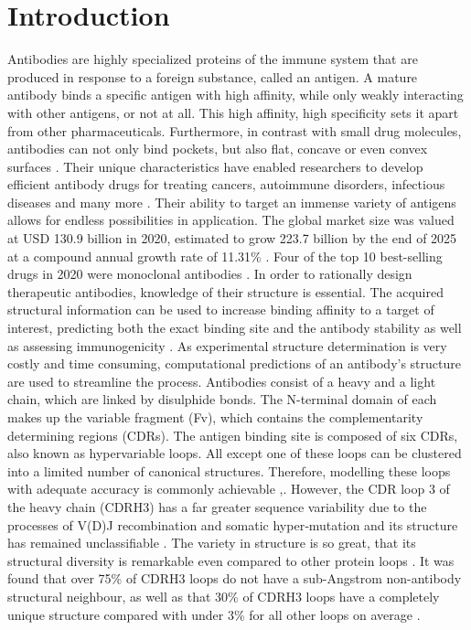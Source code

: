 \documentclass[preprint,12pt]{elsarticle}
\begin{document}

\section{Introduction}
\label{sec:sample1}
Antibodies are highly specialized proteins of the immune system that are produced in response to a foreign substance, called an antigen. A mature antibody binds a specific antigen with high affinity, while only weakly interacting with other antigens, or not at all. This high affinity, high specificity sets it apart from other pharmaceuticals. Furthermore, in contrast with small drug molecules, antibodies can not only bind pockets, but also flat, concave or even convex surfaces \cite{Tavers2001}. Their unique characteristics have enabled researchers to develop efficient antibody drugs for treating cancers, autoimmune disorders, infectious diseases and many more \cite{Lu2020}. Their ability to target an immense variety of antigens allows for endless possibilities in application. The global market size was valued at USD 130.9 billion in 2020, estimated to grow 223.7 billion by the end of 2025 at a compound annual growth rate of 11.31\% \cite{market2020}. Four of the top 10 best-selling drugs in 2020 were monoclonal antibodies \cite{Urquhart2021}.  
In order to rationally design therapeutic antibodies, knowledge of their structure is essential. The acquired structural information can be used to increase binding affinity to a target of interest, predicting both the exact binding site and the antibody stability as well as assessing immunogenicity \cite{Abhinandan2007}. As experimental structure determination is very costly and time consuming, computational predictions of an antibody’s structure are used to streamline the process.  
Antibodies consist of a heavy and a light chain, which are linked by disulphide bonds. The N-terminal domain of each makes up the variable fragment (Fv), which contains the complementarity determining regions (CDRs). The antigen binding site is composed of six CDRs, also known as hypervariable loops. All except one of these loops can be clustered into a limited number of canonical structures. Therefore, modelling these loops with adequate accuracy is commonly achievable \cite{North2011},\cite{Weitzner2015}. However, the CDR loop 3 of the heavy chain (CDRH3) has a far greater sequence variability due to the processes of V(D)J recombination and somatic hyper‐mutation and its structure has remained unclassifiable \cite{Finn2016}. The variety in structure is so great, that its structural diversity is remarkable even compared to other protein loops \cite{Regep2017}. It was found that over 75\% of CDRH3 loops do not have a sub-Angstrom non-antibody structural neighbour, as well as that 30\% of CDRH3 loops have a completely unique structure compared with under 3\% for all other loops on average \cite{Regep2017}. 
\end{document}
